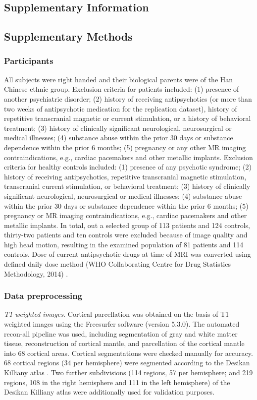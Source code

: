 \begin{refsection}
\newpage
\section*{Supplementary Information}
\subsection*{Supplementary Methods}
\subsubsection*{Participants}
All subjects were right handed and their biological parents were of the Han Chinese ethnic group. Exclusion criteria for patients included: (1) presence of another psychiatric disorder; (2) history of receiving antipsychotics (or more than two weeks of antipsychotic medication for the replication dataset), history of repetitive transcranial magnetic or current stimulation, or a history of behavioral treatment; (3) history of clinically significant neurological, neurosurgical or medical illnesses; (4) substance abuse within the prior 30 days or substance dependence within the prior 6 months; (5) pregnancy or any other MR imaging contraindications, e.g., cardiac pacemakers and other metallic implants. Exclusion criteria for healthy controls included: (1) presence of any psychotic syndrome; (2) history of receiving antipsychotics, repetitive transcranial magnetic stimulation, transcranial current stimulation, or behavioral treatment; (3) history of clinically significant neurological, neurosurgical or medical illnesses; (4) substance abuse within the prior 30 days or substance dependence within the prior 6 months; (5) pregnancy or MR imaging contraindications, e.g., cardiac pacemakers and other metallic implants. In total, out a selected group of 113 patients and 124 controls, thirty-two patients and ten controls were excluded because of image quality and high head motion, resulting in the examined population of 81 patients and 114 controls. Dose of current antipsychotic drugs at time of MRI was converted using defined daily dose method (WHO Collaborating Centre for Drug Statistics Methodology, 2014) \citep{Leucht2016DoseEF}.

\subsubsection*{Data preprocessing}
\textit{T1-weighted images.} Cortical parcellation was obtained on the basis of T1-weighted images using the Freesurfer software (version 5.3.0). The automated recon-all pipeline was used, including segmentation of gray and white matter tissue, reconstruction of cortical mantle, and parcellation of the cortical mantle into 68 cortical areas. Cortical segmentations were checked manually for accuracy. 68 cortical regions (34 per hemisphere) were segmented according to the Desikan Killiany atlas \citep{DESIKAN2006968}. Two further subdivisions \citep{CAMMOUN2012386} (114 regions, 57 per hemisphere; and 219 regions, 108 in the right hemisphere and 111 in the left hemisphere) of the Desikan Killiany atlas were additionally used for validation purposes.


\end{refsection}
